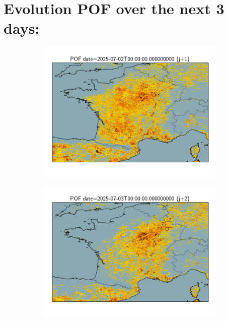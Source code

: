 \documentclass{article}
\begin{document}
\section{Evolution POF over the next 3 days:}
\begin{figure}[H]
    \centering
    \begin{subfigure}[b]{0.32\textwidth}
        \centering
        \includegraphics[width=\linewidth]{general_pof_j1.png} %
    \end{subfigure}
    \begin{subfigure}[b]{0.32\textwidth}
        \centering
        \includegraphics[width=\linewidth]{general_pof_j2.png} %
    \end{subfigure}

\end{figure}
\end{document}
